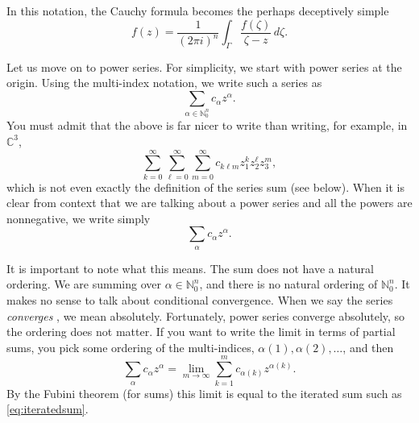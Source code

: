 \documentclass[12pt,openany]{book}
\newcommand{\C}{{\mathbb{C}}}
\newcommand{\N}{{\mathbb{N}}}
\theoremstyle{plain}
\theoremstyle{remark}
\theoremstyle{definition}
\theoremstyle{exercise}
\theoremstyle{example}
\begin{document}
In this notation, the Cauchy formula becomes the perhaps deceptively simple
\begin{equation*}
f(z) =
\frac{1}{{(2\pi i)}^n}
\int_{\Gamma}
\frac{f(\zeta)}{\zeta-z}
\,
d \zeta .
\end{equation*}

Let us move on to power series.  For simplicity, we start with
power series at the origin.  Using the multi-index notation, we write
such a series as
\begin{equation*}
\sum_{\alpha \in \N_0^n} c_\alpha {z}^\alpha .
\end{equation*}
You must admit that the
above is far nicer to write than writing, for example, in $\C^3$,
\begin{equation} \label{eq:iteratedsum}
\sum_{k=0}^\infty
\sum_{\ell=0}^\infty
\sum_{m=0}^\infty
c_{k\ell m} z_1^kz_2^\ell z_3^m ,
\end{equation}
which is not even exactly the definition of the series sum (see
below).
When it is clear
from context that we are talking about a power series
and all the powers are nonnegative,
we write simply
%
\begin{equation*}
\sum_{\alpha} c_\alpha {z}^\alpha .
\end{equation*}

It is important to note what this means.  The sum does not
have a natural ordering.  We are summing over $\alpha \in \N_0^n$, and there
is no natural ordering of $\N_0^n$.  It makes no sense to
talk about conditional convergence.  When we say the series
\emph{converges}%
%
, we mean absolutely.
Fortunately, power series converge
absolutely, so the ordering does not matter.  If you want to write
the limit in terms of partial sums, you pick some ordering of the
multi-indices, $\alpha(1), \alpha(2), \ldots$, and then
\begin{equation*}
\sum_{\alpha}
c_\alpha {z}^\alpha
=
\lim_{m \to \infty}
\sum_{k=1}^m
c_{\alpha(k)} {z}^{\alpha(k)} .
\end{equation*}
By the Fubini theorem (for sums) this limit is equal to the iterated
sum such as \eqref{eq:iteratedsum}.
\end{document}
